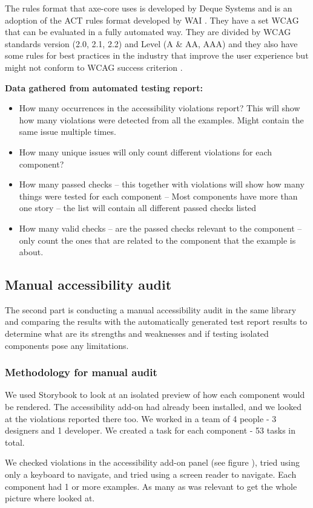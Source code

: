 \documentclass{master_thesis}
\begin{document}
The rules format that axe-core uses is developed by Deque Systems and is an adoption of the ACT rules format developed by WAI \citep{Fiers2017}. They have a set WCAG that can be evaluated in a fully automated way. They are divided by WCAG standards version (2.0, 2.1, 2.2) and Level (A \& AA, AAA) and they also have some rules for best practices in the industry that improve the user experience but might not conform to WCAG success criterion \citep{Fiers2023}.

\textbf{Data gathered from automated testing report:}
\begin{itemize}
	\item How many occurrences in the accessibility violations report? This will show how many violations were detected from all the examples. Might contain the same issue multiple times.
	\item How many unique issues will only count different violations for each component?
	\item How many passed checks – this together with violations will show how many things were tested for each component – Most components have more than one story – the list will contain all different passed checks listed
	\item How many valid checks – are the passed checks relevant to the component – only count the ones that are related to the component that the example is about.
\end{itemize}

\subsection{Manual accessibility audit}

The second part is conducting a manual accessibility audit in the same library and comparing the results with the automatically generated test report results to determine what are its strengths and weaknesses and if testing isolated components pose any limitations.
\subsubsection{Methodology for manual audit}
We used Storybook to look at an isolated preview of how each component would be rendered.
 The accessibility add-on had already been installed, and we looked at the violations reported there too. We worked in a team of 4 people - 3 designers and 1 developer. We created a task for each component - 53 tasks in total.

We checked violations in the accessibility add-on panel (see figure ), tried using only a keyboard to navigate, and tried using a screen reader to navigate. Each component had 1 or more examples. As many as was relevant to get the whole picture where looked at.
\end{document}
